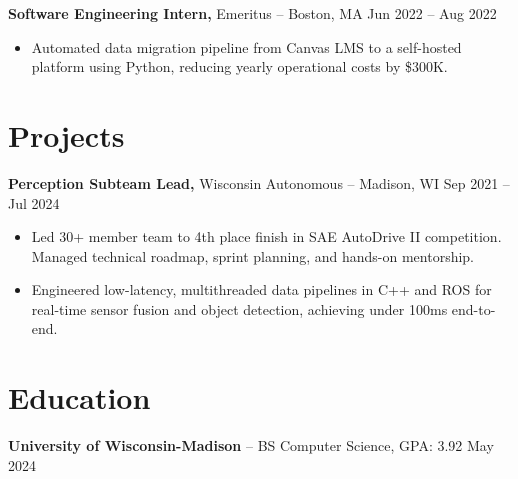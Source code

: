 \documentclass[11pt]{article}
\begin{document}
\textbf{Software Engineering Intern,} Emeritus -- Boston, MA \hfill Jun 2022 -- Aug 2022 \\
\vspace{-9pt}
\begin{itemize}
  \item Automated data migration pipeline from Canvas LMS to a self-hosted platform using Python, reducing yearly operational costs by \$300K.
\end{itemize}

\section*{Projects}

\textbf{Perception Subteam Lead,} Wisconsin Autonomous -- Madison, WI \hfill Sep 2021 -- Jul 2024 \\
\vspace{-9pt}
\begin{itemize}
  \item Led 30+ member team to 4th place finish in SAE AutoDrive II competition. Managed technical roadmap, sprint planning, and hands-on mentorship.
  \item Engineered low-latency, multithreaded data pipelines in C++ and ROS for real-time sensor fusion and object detection, achieving under 100ms end-to-end.
\end{itemize}

\section*{Education}
\textbf{University of Wisconsin-Madison} -- BS Computer Science, GPA: 3.92 \hfill May 2024
\end{document}
